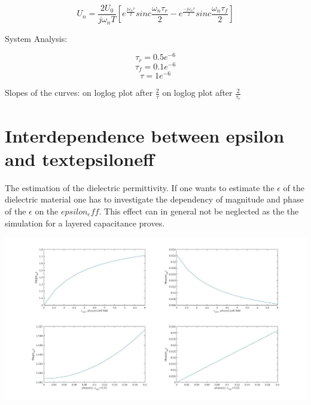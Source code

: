 \begin{equation}
 U_n = \frac{2 U_0}{j \omega_n T} [e^{\frac{j \omega_n \tau}{2}} sinc{\frac { \omega_n \tau_r }{2}} -e^{\frac{-j \omega_n \tau}{2}} sinc{\frac{ \omega_n \tau_f}{2}}]
\end{equation}
 
System Analysis: 
 
 
\begin{equation}
 \tau_r = 0.5e^{-6 }
  \end{equation}
  \begin{equation}
 \tau_f = 0.1e^{-6}
  \end{equation}
 \begin{equation}
\tau= 1e^{-6}
 \end{equation}
 
Slopes of the curves:  on loglog plot after $\frac{2}{\tau}$  on loglog plot after $\frac{2}{\tau_r}$



\section{Interdependence between epsilon and textepsiloneff} 
The estimation of the dielectric permittivity. If one wants to estimate the $\epsilon$ of the dielectric material one has to investigate the dependency of magnitude and phase of the $\epsilon$ on the $epsilon_eff$. This effect can in general not be neglected as the the simulation for a layered capacitance proves.  

\begin{center}
	\includegraphics[width=\textwidth]{figures/Theory/layeredepsilon.jpg}
	
	\end{center}
	

